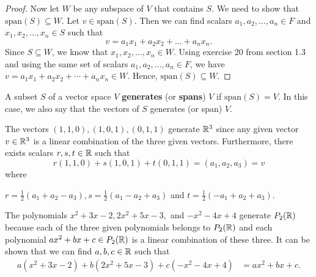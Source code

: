 \begin{proof}
Now let \( W  \) be any subspace of \( V  \) that contains \( S  \).  We need to show that \( \text{span}(S) \subseteq W  \). Let \( v \in \text{span}(S) \). Then we can find scalars \( a_{1}, a_{2}, \dots, a_{n} \in F    \) and \( x_{1} , x_{2} , \dots, x_{n} \in S  \) such that 
\[  v = a_{1} x_{1} + a_{2} x_{2} + \dots + a_{n} x_{n}.   \]
Since \( S \subseteq W  \), we know that \( x_{1}, x_{2} , \dots , x_{n} \in W  \). Using exercise 20 from section 1.3 and using the same set of scalars \( a_{1}, a_{2}, \dots, a_{n} \in F  \), we have \( v = a_{1} x_{1} + a_{2} x_{2} + \cdots + a_{n} x_{n} \in W  \). Hence, \( \text{span}(S) \subseteq W  \).
\end{proof}

\begin{definition}[ ]
    A subset \( S  \) of a vector space \( V  \) \textbf{generates} (or \textbf{spans}) \( V  \) if \( \text{span}(S) = V  \). In this case, we also say that the vectors of \( S  \) generates (or span) \( V  \).
\end{definition}

\begin{eg}[Vectors in \( \R^3 \)]
    The vectors \( (1,1,0) , (1,0,1) , (0,1,1)   \) generate \( \mathbb{R}^{3} \) since any given vector \( v \in \mathbb{R}^{3}  \) is a linear combination of the three given vectors. Furthermore, there exists scalars \( r,s,t \in \mathbb{R} \) such that
    \[  r(1,1,0) + s(1,0,1) + t(0,1,1) = (a_{1}, a_{2} , a_{3}) = v \]
    where
    \begin{center}
       \( r = \frac{ 1 }{ 2 }  (a_{1} + a_{2} - a_{3}), s = \frac{ 1 }{ 2 }   (a_{1} - a_{2} + a_{3}) \) and \( t = \frac{ 1 }{ 2 }  (-a_{1} + a_{2} + a_{3}) \). 
    \end{center}
\end{eg}

\begin{eg}[Polynomials]\label{Generating Polynomials section 1.4}
   The polynomials \( x^{2} + 3x - 2, 2x^{2} + 5x - 3,   \) and \( -x^{2} - 4x + 4  \) generate \( P_{2}(\mathbb{R} ) \) because each of the three given polynomials belongs to \( P_{2}(\mathbb{R}) \) and each polynomial \( ax^{2} + bx + c \in P_{2}(\mathbb{R}) \) is a linear combination of these three. It can be shown that we can find \( a,b,c   \in \mathbb{R}  \) such that 
   \begin{align*}
   a (x^{2} + 3x - 2)   + b (2x^{2} + 5x - 3) +  c (-x^{2} - 4x + 4) &= ax^{2} + bx + c.   
\end{align*}
\end{eg}

